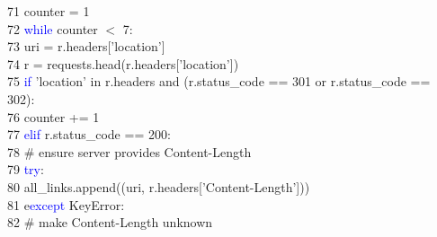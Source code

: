 71	 \hspace*{5mm}                    \hspace*{25mm}counter = 1\\
72	 \hspace*{5mm}                    \hspace*{25mm}\textcolor{blue}{while} counter $<$ 7:\\
73	 \hspace*{5mm}                        \hspace*{30mm}uri = r.headers['location']\\
74	 \hspace*{5mm}                        \hspace*{30mm}r = requests.head(r.headers['location'])\\
75	 \hspace*{5mm}                        \hspace*{30mm}\textcolor{blue}{if} 'location' in r.headers and (r.status\_code == 301 or r.status\_code == 302):\\
76	 \hspace*{5mm}                            \hspace*{35mm}counter += 1\\
77	 \hspace*{5mm}                        \hspace*{30mm}\textcolor{blue}{elif} r.status\_code == 200:\\
78	 \hspace*{5mm}                            \hspace*{35mm}\# ensure server provides Content-Length\\
79	 \hspace*{5mm}                            \hspace*{35mm}\textcolor{blue}{try}:\\
80	 \hspace*{5mm}                                \hspace*{40mm}all\_links.append((uri, r.headers['Content-Length']))\\
81	 \hspace*{5mm}                            \hspace*{35mm}e\textcolor{blue}{except} KeyError:\\
82	 \hspace*{5mm}                                \hspace*{40mm}\# make Content-Length unknown\\
